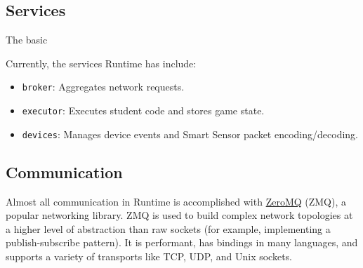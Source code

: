 \documentclass[12pt]{book}
\begin{document}
  \subsection{Services}

  The basic


  Currently, the services Runtime has include:
  \begin{itemize}
  \item \texttt{broker}: Aggregates network requests.
  \item \texttt{executor}: Executes student code and stores game state.
  \item \texttt{devices}: Manages device events and Smart Sensor packet encoding/decoding.
  \end{itemize}

  \subsection{Communication}

  Almost all communication in Runtime is accomplished with \href{https://zeromq.org/}{ZeroMQ} (ZMQ), a popular networking library.
  ZMQ is used to build complex network topologies at a higher level of abstraction than raw sockets (for example, implementing a publish-subscribe pattern).
  It is performant, has bindings in many languages, and supports a variety of transports like TCP, UDP, and Unix sockets.


\end{document}
